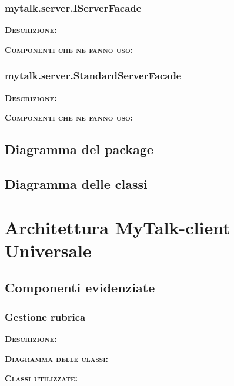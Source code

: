 \subsubsection{mytalk.server.IServerFacade}
\begin{description}
	\item{\scshape\bfseries Descrizione:} 
	\item{\scshape\bfseries Componenti che ne fanno uso:} 
\end{description}

\subsubsection{mytalk.server.StandardServerFacade}
\begin{description}
	\item{\scshape\bfseries Descrizione:} 
	\item{\scshape\bfseries Componenti che ne fanno uso:} 
\end{description}

\subsection{Diagramma del package}

\subsection{Diagramma delle classi}
\clearpage

\section{Architettura MyTalk-client Universale}

\subsection{Componenti evidenziate}

\subsubsection{Gestione rubrica}
\begin{description}
	\item{\scshape\bfseries Descrizione:} 
	\item{\scshape\bfseries Diagramma delle classi:}
	\item{\scshape\bfseries Classi utilizzate:} 
\end{description}

